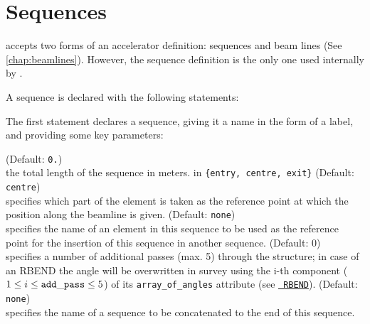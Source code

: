
\chapter{Sequences}
\label{chap:sequence}

\madx accepts two forms of an accelerator definition: sequences and
beam lines (See \ref{chap:beamlines}). 
However, the sequence definition is the only one used internally by \madx.

A sequence is declared with the following statements:

The first statement declares a sequence, giving it a name in the form of
a label, and providing some key parameters: 

\begin{madlist}
    (Default: {\tt 0.})\\
     the total length of the sequence in meters. 
    in {\tt \{entry, centre, exit\}} (Default:
          {\tt centre}) \\
     specifies which part of the element is taken as the reference point 
     at which the position along the beamline is given.
    (Default: {\tt none})\\
   specifies the name of an element in this sequence to be used as the
   reference point for the insertion of this sequence in another
   sequence.
    (Default: 0)\\ 
     specifies a number of additional passes (max. 5) through the
     structure; in case of an RBEND the angle will be overwritten in  survey
     using the i-th component ($1 \le i \le {\tt add\_pass} \le 5$) of
     its {\tt array\_of\_angles} attribute (see \hyperref[sec:rbend]{\tt 
     RBEND}). 
    (Default: {\tt none})\\
     specifies the name of a sequence to be concatenated 
     to the end of this sequence.
\end{madlist}
 
